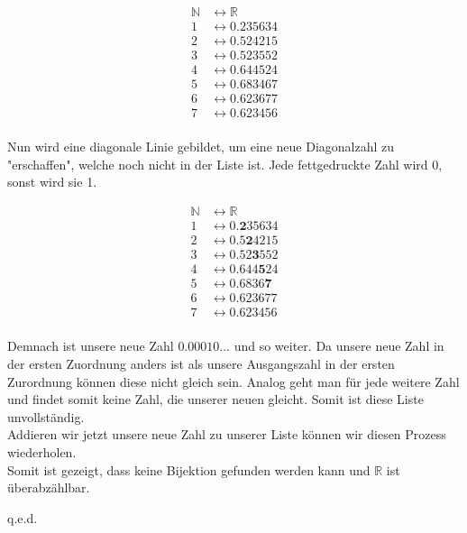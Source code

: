 \documentclass[headsepline,12pt,a4paper]{scrartcl}
\begin{document}
\begin{equation} 
 \begin{aligned} 
  \mathbb{N} &\leftrightarrow \mathbb{R} \\ 
     1 &\leftrightarrow 0.235634\\ 
     2 &\leftrightarrow 0.524215\\
     3&\leftrightarrow  0.523552\\
     4&\leftrightarrow  0.644524\\
     5&\leftrightarrow  0.683467\\
     6&\leftrightarrow  0.623677\\
     7&\leftrightarrow  0.623456\\
 \end{aligned} 
\end{equation}

Nun wird eine diagonale Linie gebildet, um eine neue Diagonalzahl zu "erschaffen", welche noch nicht in der Liste ist. Jede fettgedruckte Zahl wird 0, sonst wird sie 1. 

\begin{equation} 
 \begin{aligned} 
  \mathbb{N} &\leftrightarrow \mathbb{R} \\ 
     1 &\leftrightarrow 0.\textbf{2}35634\\ 
     2 &\leftrightarrow 0.5\textbf{2}4215\\
     3&\leftrightarrow  0.52\textbf{3}552\\
     4&\leftrightarrow  0.644\textbf{5}24\\
     5&\leftrightarrow  0.6836\textbf{7}\\
     6&\leftrightarrow  0.623677\\
     7&\leftrightarrow  0.623456\\
 \end{aligned} 
\end{equation}

\newpage


Demnach ist unsere neue Zahl $ 0.00010... $ und so weiter. Da unsere neue Zahl in der ersten Zuordnung anders ist als unsere Ausgangszahl in der ersten Zurordnung können diese nicht gleich sein. Analog geht man für jede weitere Zahl und findet somit keine Zahl, die unserer neuen gleicht. Somit ist diese Liste unvollständig. \\
Addieren wir jetzt unsere neue Zahl zu unserer Liste können wir diesen Prozess wiederholen. \\
Somit ist gezeigt, dass keine Bijektion gefunden werden kann und $ \mathbb{R} $ ist überabzählbar. 
\begin{flushright}
q.e.d.
\end{flushright}
\end{document}
